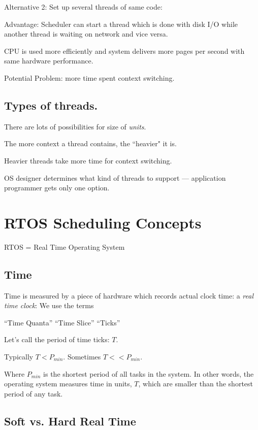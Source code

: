 \documentclass{article}	%
\begin{document}
Alternative 2:   Set up several threads of same code:

Advantage:   Scheduler can start a thread which is done with disk I/O while
another thread is waiting on network and vice versa.

CPU is used more efficiently and system delivers more pages per second with same hardware performance.

Potential Problem:  more time spent context switching.


\subsection{Types of threads.}

There are lots of possibilities for size of {\it units}.

The more context a thread contains, the ``heavier" it is.

Heavier threads take more time for context switching.

OS designer determines what kind of threads to support --- application programmer gets only one
option.




\section{RTOS Scheduling Concepts}
RTOS = Real Time Operating System	%

\subsection{Time}\label{Time}


Time is measured by a piece of hardware which records actual
clock time: a {\it real time clock}:
We use the terms	%

``Time Quanta'' ``Time Slice''  ``Ticks''

Let's call the period of time ticks: $T$.

Typically $T < P_{min}$. Sometimes $T << P_{min}$.

Where $P_{min}$ is the shortest period of all tasks in the  system.
In other words, the operating system measures time in units, $T$, which
are smaller than the shortest period of any task.

\subsection{Soft vs. Hard Real Time}
\end{document}

